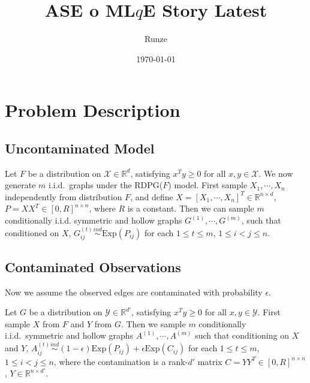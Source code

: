 \documentclass[a4paper]{article}
\title{ASE o ML$q$E Story Latest}
\author{Runze}
\date{\today}
\begin{document}
\maketitle

\section{Problem Description}

\subsection{Uncontaminated Model}
Let $F$ be a distribution on $\mathcal{X} \in \mathbb{R}^d$, satisfying $x^T y \ge 0$ for all $x, y \in \mathcal{X}$. We now generate $m$ i.i.d.~graphs under the RDPG($F$) model. First sample $X_1, \cdots, X_n$ independently from distribution $F$,  and define $X = [X_1, \cdots, X_n]^T \in \mathbb{R}^{n \times d}$, $P = X X^T \in [0, R]^{n \times n}$, where $R$ is a constant. Then we can sample $m$ conditionally i.i.d. symmetric and hollow graphs $G^{(1)}, \cdots, G^{(m)}$, such that conditioned on $X$, $G^{(t)}_{ij} \stackrel{ind}{\sim} \mathrm{Exp}(P_{ij})$ for each $1 \le t \le m$, $1 \le i < j \le n$.

%


\subsection{Contaminated Observations}
Now we assume the observed edges are contaminated with probability $\epsilon$.

Let $G$ be a distribution on $\mathcal{Y} \in \mathbb{R}^{d'}$, satisfying $x^T y \ge 0$ for all $x, y \in \mathcal{Y}$. First sample $X$ from $F$ and $Y$ from $G$.
Then we sample $m$ conditionally i.i.d.~symmetric and hollow graphs $A^{(1)}, \cdots, A^{(m)}$ such that conditioning on $X$ and $Y$, $A^{(t)}_{ij} \stackrel{ind}{\sim} (1-\epsilon) \mathrm{Exp}(P_{ij}) + \epsilon \mathrm{Exp}(C_{ij})$ for each $1 \le t \le m$, $1 \le i < j \le n$,  where the contamination is a rank-$d'$ matrix $C = Y Y^T \in [0, R]^{n \times n}$, $Y \in \mathbb{R}^{n \times d'}$. 
\end{document}
